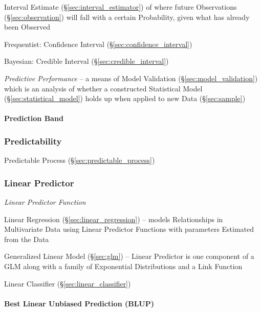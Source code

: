 Interval Estimate (\S\ref{sec:interval_estimator}) of where future Observations
(\S\ref{sec:observation}) will fall with a certain Probability, given what has
already been Observed

Frequentist: Confidence Interval (\S\ref{sec:confidence_interval})

Bayesian: Credible Interval (\S\ref{sec:credible_interval})

\emph{Predictive Performance} -- a means of Model Validation
(\S\ref{sec:model_validation}) which is an analysis of whether a constructed
Statistical Model (\S\ref{sec:statistical_model}) holds up when applied to new
Data (\S\ref{sec:sample})



\paragraph{Prediction Band}\label{sec:prediction_band}\hfill



\subsubsection{Predictability}\label{sec:predictability}

\fist Predictable Process (\S\ref{sec:predictable_process})



\subsubsection{Linear Predictor}\label{sec:linear_predictor}

\emph{Linear Predictor Function}

\fist Linear Regression (\S\ref{sec:linear_regression}) -- models Relationships
in Multivariate Data using Linear Predictor Functions with parameters Estimated
from the Data

\fist Generalized Linear Model (\S\ref{sec:glm}) -- Linear Predictor is one
component of a GLM along with a family of Exponential Distributions and a Link
Function

\fist Linear Classifier (\S\ref{sec:linear_classifier})



\paragraph{Best Linear Unbiased Prediction (BLUP)}\label{sec:blup}\hfill

